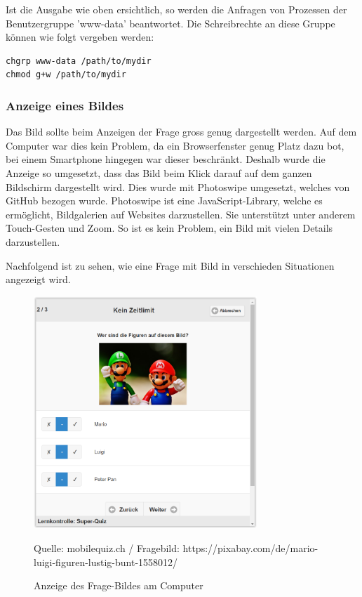 Ist die Ausgabe wie oben ersichtlich, so werden die Anfragen von Prozessen der Benutzergruppe 'www-data' beantwortet. Die Schreibrechte an diese Gruppe können wie folgt vergeben werden:
\begin{lstlisting}
chgrp www-data /path/to/mydir
chmod g+w /path/to/mydir
\end{lstlisting}




\subsubsection{Anzeige eines Bildes}
Das Bild sollte beim Anzeigen der Frage gross genug dargestellt werden. Auf dem Computer war dies kein Problem, da ein Browserfenster genug Platz dazu bot, bei einem Smartphone hingegen war dieser beschränkt. Deshalb wurde die Anzeige so umgesetzt, dass das Bild beim Klick darauf auf dem ganzen Bildschirm dargestellt wird. Dies wurde mit Photoswipe \cite{photoswipe} umgesetzt, welches von GitHub \cite{github_photoswipe} bezogen wurde. Photoswipe ist eine JavaScript-Library, welche es ermöglicht, Bildgalerien auf Websites darzustellen. Sie unterstützt unter anderem Touch-Gesten und Zoom. So ist es kein Problem, ein Bild mit vielen Details darzustellen.

Nachfolgend ist zu sehen, wie eine Frage mit Bild in verschieden Situationen angezeigt wird.

\begin{figure}[H]
	\centering
	\includegraphics[width=0.75\textwidth]{Images/Frage-Bild_Anzeige_PC.PNG}
	\caption{Anzeige des Frage-Bildes am Computer}
	Quelle: mobilequiz.ch / Fragebild: https://pixabay.com/de/mario-luigi-figuren-lustig-bunt-1558012/
\end{figure}

